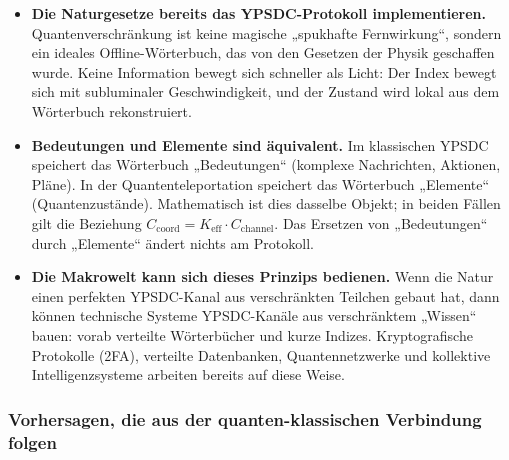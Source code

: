 \documentclass[12pt,a4paper]{article}
\theoremstyle{remark}
\begin{document}
	\begin{itemize}
		\item \textbf{Die Naturgesetze bereits das YPSDC-Protokoll implementieren.} Quantenverschränkung ist keine magische „spukhafte Fernwirkung“, sondern ein ideales Offline-Wörterbuch, das von den Gesetzen der Physik geschaffen wurde. Keine Information bewegt sich schneller als Licht: Der Index bewegt sich mit subluminaler Geschwindigkeit, und der Zustand wird lokal aus dem Wörterbuch rekonstruiert.
		\item \textbf{Bedeutungen und Elemente sind äquivalent.} Im klassischen YPSDC speichert das Wörterbuch „Bedeutungen“ (komplexe Nachrichten, Aktionen, Pläne). In der Quantenteleportation speichert das Wörterbuch „Elemente“ (Quantenzustände). Mathematisch ist dies dasselbe Objekt; in beiden Fällen gilt die Beziehung \( C_{\mathrm{coord}} = K_{\mathrm{eff}} \cdot C_{\mathrm{channel}} \). Das Ersetzen von „Bedeutungen“ durch „Elemente“ ändert nichts am Protokoll.
		\item \textbf{Die Makrowelt kann sich dieses Prinzips bedienen.} Wenn die Natur einen perfekten YPSDC-Kanal aus verschränkten Teilchen gebaut hat, dann können technische Systeme YPSDC-Kanäle aus verschränktem „Wissen“ bauen: vorab verteilte Wörterbücher und kurze Indizes. Kryptografische Protokolle (2FA), verteilte Datenbanken, Quantennetzwerke und kollektive Intelligenzsysteme arbeiten bereits auf diese Weise.
	\end{itemize}
	
	\subsubsection*{Vorhersagen, die aus der quanten-klassischen Verbindung folgen}
	
\end{document}
